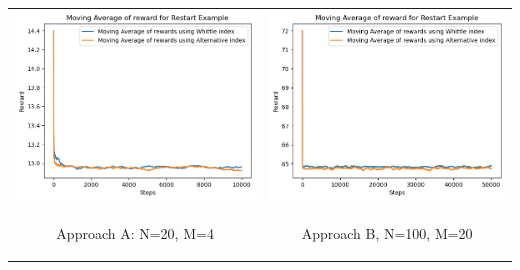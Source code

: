 \documentclass{slides}
\begin{document}
{{%
\begin{center}
\begin{tabular}{cc}
\includegraphics[scale=0.6]{homo_restart_comparison_A.png} &
\includegraphics[scale=0.6]{homo_restart_comparison_B.png} \\
\begin{small}
 Approach A: N=20, M=4\end{small} & \begin{small}Approach B, N=100, M=20\end{small}\\

\end{tabular}
\end{center}}}
\end{document}
